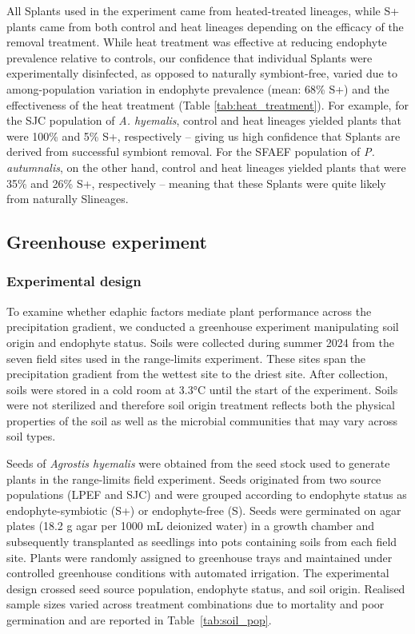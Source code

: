 \documentclass[12pt]{article}\usepackage[]{graphicx}\usepackage[dvipsnames]{xcolor}
\begin{document}
All S\textminus plants used in the experiment came from heated-treated lineages, while S+ plants came from both control and heat lineages depending on the efficacy of the removal treatment. 
While heat treatment was effective at reducing endophyte prevalence relative to controls, our confidence that individual S\textminus plants were experimentally disinfected, as opposed to naturally symbiont-free, varied due to among-population variation in endophyte prevalence (mean: 68\% S+) and the effectiveness of the heat treatment (Table \ref{tab:heat_treatment}). 
For example, for the SJC population of \emph{A. hyemalis}, control and heat lineages yielded plants that were 100\% and 5\% S+, respectively -- giving us high confidence that S\textminus plants are derived from successful symbiont removal. 
For the SFAEF population of \emph{P. autumnalis}, on the other hand, control and heat lineages yielded plants that were 35\% and 26\% S+, respectively -- meaning that these S\textminus plants were quite likely from naturally S\textminus lineages.


\subsection{Greenhouse experiment}
\label{sec:greenhouse}

\subsubsection{Experimental design}

To examine whether edaphic factors mediate plant performance across the precipitation gradient, we conducted a greenhouse experiment
manipulating soil origin and endophyte status.
Soils were collected during summer 2024 from the seven field sites used in the range‐limits experiment.
These sites span the precipitation gradient from the wettest site to the driest site. 
After collection, soils were stored in a cold room at 3.3°C until the start of the experiment. 
Soils were not sterilized and therefore soil origin treatment reflects both the physical properties of the soil as well as the microbial communities that may vary across soil types.

Seeds of \textit{Agrostis hyemalis} were obtained from the seed stock used to generate plants in the range-limits field experiment. 
Seeds originated from two source populations (LPEF and SJC) and were grouped according to endophyte status as endophyte-symbiotic (S+) or endophyte-free (S\textminus).
Seeds were germinated on agar plates (18.2 g agar per 1000 mL deionized water) in a growth chamber and subsequently transplanted as seedlings
into pots containing soils from each field site. 
Plants were randomly assigned to greenhouse trays and maintained under controlled greenhouse conditions with automated irrigation.
The experimental design crossed seed source population, endophyte status, and soil origin. 
Realised sample sizes varied across treatment combinations due to mortality and poor germination and are reported in Table~\ref{tab:soil_pop}.
\end{document}
